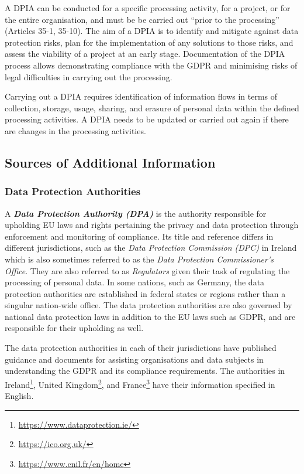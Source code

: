 A DPIA can be conducted for a specific processing activity, for a project, or for the entire organisation, and must be be carried out ``prior to the processing'' (Articles 35-1, 35-10).
The aim of a DPIA is to identify and mitigate against data protection risks, plan for the implementation of any solutions to those risks, and assess the viability of a project at an early stage.
Documentation of the DPIA process allows demonstrating compliance with the GDPR and minimising risks of legal difficulties in carrying out the processing.

Carrying out a DPIA requires identification of information flows in terms of collection, storage, usage, sharing, and erasure of personal data within the defined processing activities. A DPIA needs to be updated or carried out again if there are changes in the processing activities.

\subsection{Sources of Additional Information}

\subsubsection{Data Protection Authorities}
A \textit{\textbf{Data Protection Authority (DPA)}} is the authority responsible for upholding EU laws and rights pertaining the privacy and data protection through enforcement and monitoring of compliance.
Its title and reference differs in different jurisdictions, such as the \textit{Data Protection Commission (DPC)} in Ireland which is also sometimes referred to as the \textit{Data Protection Commissioner's Office}. 
They are also referred to as \textit{Regulators} given their task of regulating the processing of personal data.
In some nations, such as Germany, the data protection authorities are established in federal states or regions rather than a singular nation-wide office. The data protection authorities are also governed by national data protection laws in addition to the EU laws such as GDPR, and are responsible for their upholding as well.

The data protection authorities in each of their jurisdictions have published guidance and documents for assisting organisations and data subjects in understanding the GDPR and its compliance requirements. The authorities in Ireland\footnote{\url{https://www.dataprotection.ie/}}, United Kingdom\footnote{\url{https://ico.org.uk/}}, and France\footnote{\url{https://www.cnil.fr/en/home}} have their information specified in English.


